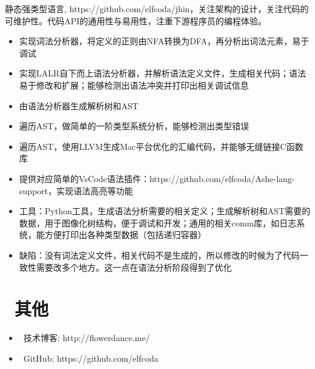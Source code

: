 \documentclass{resume}
\begin{document}
\begin{onehalfspacing}
静态强类型语言, https://github.com/elfcoda/jhin，关注架构的设计，关注代码的可维护性。代码API的通用性与易用性，注重下游程序员的编程体验。
\begin{itemize}
  \item 实现词法分析器，将定义的正则由NFA转换为DFA，再分析出词法元素，易于调试
  \item 实现LALR自下而上语法分析器，并解析语法定义文件，生成相关代码；语法易于修改和扩展；能够检测出语法冲突并打印出相关调试信息
  \item 由语法分析器生成解析树和AST
  \item 遍历AST，做简单的一阶类型系统分析，能够检测出类型错误
  \item 遍历AST，使用LLVM生成Mac平台优化的汇编代码，并能够无缝链接C函数库
  \item 提供对应简单的VsCode语法插件：https://github.com/elfcoda/Ashe-lang-support，实现语法高亮等功能
  \item 工具：Python工具，生成语法分析需要的相关定义；生成解析树和AST需要的数据，用于图像化树结构，便于调试和开发；通用的相关comm库，如日志系统，能方便打印出各种类型数据（包括递归容器）
  \item 缺陷：没有词法定义文件，相关代码不是生成的，所以修改的时候为了代码一致性需要改多个地方。这一点在语法分析阶段得到了优化
\end{itemize}
\end{onehalfspacing}


\section{\faInfo\ 其他}
\begin{itemize}[parsep=0.5ex]
  \item \faHome\ 技术博客: http://flowerdance.me/
  \item \faGithubAlt\ GitHub: https://github.com/elfcoda
\end{itemize}

%
%
\end{document}
